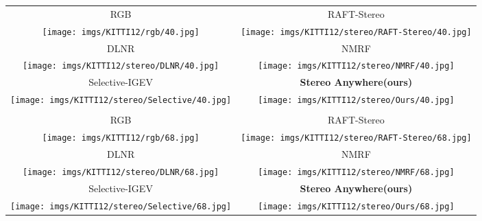 \documentclass[10pt,twocolumn,letterpaper]{article}
\newcommand{\method}[0]{Stereo Anywhere\xspace}
\begin{document}
\begin{figure*}[h]
    \centering
    \renewcommand{\tabcolsep}{1pt}
    \begin{tabular}{cc}
        \small RGB &
        \small RAFT-Stereo \cite{lipson2021raft} \\
        \texttt{[image: imgs/KITTI12/rgb/40.jpg]} &
        \texttt{[image: imgs/KITTI12/stereo/RAFT-Stereo/40.jpg]} \\
        \small DLNR \cite{zhao2023high} &
        \small NMRF \cite{guan2024neural} \\
        \texttt{[image: imgs/KITTI12/stereo/DLNR/40.jpg]} &
        \texttt{[image: imgs/KITTI12/stereo/NMRF/40.jpg]} \\
        \small Selective-IGEV \cite{wang2024selective} &
        \textbf{\method (ours)} \\
        \texttt{[image: imgs/KITTI12/stereo/Selective/40.jpg]} &
        \texttt{[image: imgs/KITTI12/stereo/Ours/40.jpg]} \\ \\
        \small RGB &
        \small RAFT-Stereo \cite{lipson2021raft} \\
        \texttt{[image: imgs/KITTI12/rgb/68.jpg]} &
        \texttt{[image: imgs/KITTI12/stereo/RAFT-Stereo/68.jpg]} \\
        \small DLNR \cite{zhao2023high} &
        \small NMRF \cite{guan2024neural} \\
        \texttt{[image: imgs/KITTI12/stereo/DLNR/68.jpg]} &
        \texttt{[image: imgs/KITTI12/stereo/NMRF/68.jpg]} \\
        \small Selective-IGEV \cite{wang2024selective} &
        \textbf{\method (ours)} \\
        \texttt{[image: imgs/KITTI12/stereo/Selective/68.jpg]} &
        \texttt{[image: imgs/KITTI12/stereo/Ours/68.jpg]} \\
    \end{tabular}

    \caption{\textbf{Qualitative Results -- KITTI 2012 (part 1).} Predictions by state-of-the-art models and \method.}
    \label{fig:qual_kitti12_1}\vspace{-0.3cm}

\end{figure*}
\end{document}
